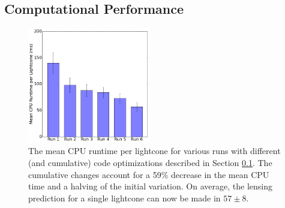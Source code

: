 \documentclass[%
 reprint,
 amsmath,amssymb,
 aps,nofootinbib
]{revtex4-1}
\begin{document}
\subsection{Computational Performance} \label{comp_perform}

\begin{figure}
    \centering
    \includegraphics[width=0.475\textwidth]{figs-swe/thesis/profile_bar.png}
    \captionsetup{justification=raggedright,singlelinecheck=false}
    \caption{The mean CPU runtime per lightcone for various runs with different (and cumulative) code optimizations described in Section \ref{comp_perform}. The cumulative changes account for a 59\% decrease in the mean CPU time and a halving of the initial variation. On average, the lensing prediction for a single lightcone can now be made in $57\pm8$.}
    \label{fig:cpu_plot}
\end{figure}
\end{document}
